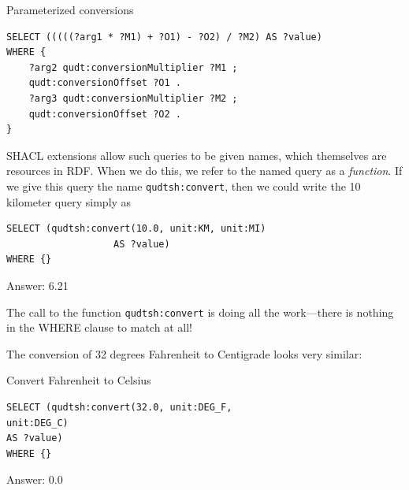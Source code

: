 \begin{query}Parameterized conversions\end{query}
\begin{lstlisting}
SELECT (((((?arg1 * ?M1) + ?O1) - ?O2) / ?M2) AS ?value)
WHERE {
    ?arg2 qudt:conversionMultiplier ?M1 ;
    qudt:conversionOffset ?O1 .
    ?arg3 qudt:conversionMultiplier ?M2 ;
    qudt:conversionOffset ?O2 .
}
\end{lstlisting}


SHACL extensions \cite{Steyskal:17:SAF} allow such queries to be given names, 
which themselves are
resources in RDF.   When we do this, we refer to the named query 
as a \emph{function}.  If we give this query the 
name \texttt{qudtsh:convert}, then
we could write the 10 kilometer query simply as

\begin{query}
\begin{lstlisting}
SELECT (qudtsh:convert(10.0, unit:KM, unit:MI)
                   AS ?value)
WHERE {}
\end{lstlisting}
\end{query}

Answer: 6.21

The call to the function \texttt{qudtsh:convert} is doing all the work---there is
nothing in the
WHERE clause to match at all!

The conversion of 32 degrees Fahrenheit to Centigrade looks very
similar:

\begin{query}Convert Fahrenheit to Celsius\end{query}
\begin{lstlisting}
SELECT (qudtsh:convert(32.0, unit:DEG_F,
unit:DEG_C)
AS ?value)
WHERE {}
\end{lstlisting}


Answer: 0.0

